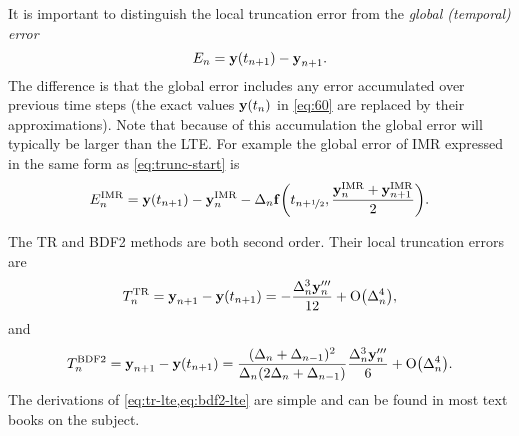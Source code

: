 It is important to distinguish the local truncation error from the \emph{global (temporal) error}
\begin{equation}
  \label{eq:global-temporal-error}
    E_n = \boldsymbol{\mathrm{y}}(t_{n+1}) - \boldsymbol{\mathrm{y}}_{n+1}.
\end{equation}
The difference is that the global error includes any error accumulated over previous time steps (\ie the exact values $\boldsymbol{\mathrm{y}}(t_n)$ in \cref{eq:60} are replaced by their approximations).
Note that because of this accumulation the global error will typically be larger than the LTE.
For example the global error of IMR expressed in the same form as \cref{eq:trunc-start} is
\begin{equation}
  E_n^{\mathrm{IMR}} =  \boldsymbol{\mathrm{y}}(t_{n+1}) - \boldsymbol{\mathrm{y}}_n^{\mathrm{IMR}} - \Delta_{n} {\boldsymbol{\mathrm{f}}{\left(  t_{n+\nicefrac{1}{2}}, \frac{\boldsymbol{\mathrm{y}}_n^{\mathrm{IMR}} + \boldsymbol{\mathrm{y}}_{n+1}^{\mathrm{IMR}}}{2}  \right)}}.
\end{equation}

The TR and BDF2 methods are both second order.
Their local truncation errors are \cite[261]{GreshoSani}
\begin{equation}
  \label{eq:tr-lte}
  T_n^{\mathrm{TR}} = \boldsymbol{\mathrm{y}}_{n+1} - \boldsymbol{\mathrm{y}}(t_{n+1}) = -\frac{\Delta_{n}^3 \boldsymbol{\mathrm{y}}_n'''}{12}
  + \mathrm{O}{\left( \Delta_{n}^4 \right)},
\end{equation}
and \cite[715]{GreshoSani}
\begin{equation}
  \label{eq:bdf2-lte}
  T_n^{\mathrm{BDF2}} = \boldsymbol{\mathrm{y}}_{n+1} - \boldsymbol{\mathrm{y}}(t_{n+1}) = \frac{(\Delta_{n} + \Delta_{n-1})^2}{\Delta_{n}(2\Delta_{n} + \Delta_{n-1})}
  \frac{\Delta_{n}^3 \boldsymbol{\mathrm{y}}_n'''}{6}
  + \mathrm{O}{\left( \Delta_{n}^4 \right)}.
\end{equation}
The derivations of \cref{eq:tr-lte,eq:bdf2-lte} are simple and can be found in most text books on the subject.

